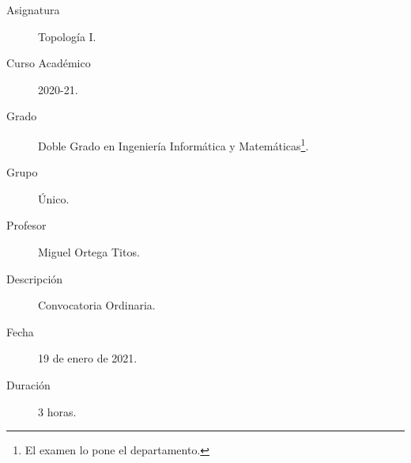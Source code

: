\documentclass[12pt]{article}
\begin{document}

    
    

    \begin{description}
        \item[Asignatura] Topología I.
        \item[Curso Académico] 2020-21.
        \item[Grado] Doble Grado en Ingeniería Informática y Matemáticas\footnote{El examen lo pone el departamento.}.
        \item[Grupo] Único.
        \item[Profesor] Miguel Ortega Titos.
        \item[Descripción] Convocatoria Ordinaria.
        \item[Fecha] 19 de enero de 2021.
        \item[Duración] 3 horas.
    
    \end{description}
    \newpage
    
\end{document}
